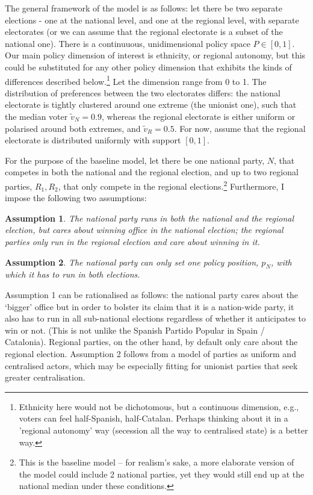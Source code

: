 \documentclass[11pt]{article}
\newtheorem{assumption}{Assumption}
\begin{document}
The general framework of the model is as follows: let there be two separate elections - one at the national level, and one at the regional level, with separate electorates (or we can assume that the regional electorate is a subset of the national one). There is a continuuous, unidimensional policy space $P \in [0, 1]$. Our main policy dimension of interest is ethnicity, or regional autonomy, but this could be substituted for any other policy dimension that exhibits the kinds of differences described below.\footnote{Ethnicity here would not be dichotomous, but a continuous dimension, e.g., voters can feel half-Spanish, half-Catalan. Perhaps thinking about it in a 'regional autonomy' way (secession all the way to centralised state) is a better way.} Let the dimension range from 0 to 1. The distribution of preferences between the two electorates differs: the national electorate is tightly clustered around one extreme (the unionist one), such that the median voter $\tilde{v}_N = 0.9$, whereas the regional electorate is either uniform or polarised around both extremes, and $\tilde{v}_R = 0.5$. For now, assume that the regional electorate is distributed uniformly with support $[0, 1]$.

For the purpose of the baseline model, let there be one national party, $N$, that competes in both the national and the regional election, and up to two regional parties, $R_1, R_2$, that only compete in the regional elections.\footnote{This is the baseline model -- for realism's sake, a more elaborate version of the model could include 2 national parties, yet they would still end up at the national median under these conditions.} Furthermore, I impose the following two assumptions:

\begin{assumption}
    The national party runs in both the national and the regional election, but cares about winning office in the national election; the regional parties only run in the regional election and care about winning in it.
\end{assumption}
\begin{assumption}
    The national party can only set one policy position, $p_N$, with which it has to run in both elections.
\end{assumption}

Assumption 1 can be rationalised as follows: the national party cares about the `bigger' office but in order to bolster its claim that it is a nation-wide party, it also has to run in all sub-national elections regardless of whether it anticipates to win or not. (This is not unlike the Spanish Partido Popular in Spain / Catalonia). Regional parties, on the other hand, by default only care about the regional election. Assumption 2 follows from a model of parties as uniform and centralised actors, which may be especially fitting for unionist parties that seek greater centralisation.
\end{document}
